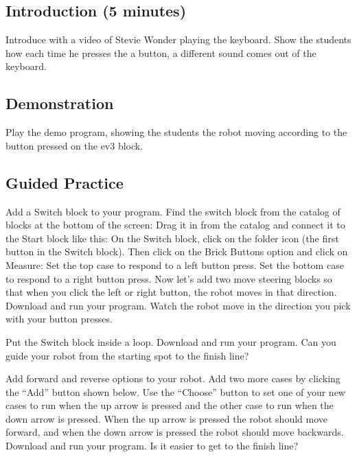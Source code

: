 \documentclass{lessonplan}
\begin{document}
    \subsection{Introduction (5 minutes)}
      Introduce with a video of Stevie Wonder playing the keyboard. Show the students how each time he presses the a button, a different sound comes out of the keyboard.
      
    \subsection{Demonstration}
      Play the demo program, showing the students the robot moving according to the button pressed on the ev3 block.
      
    \subsection{Guided Practice}
    Add a Switch block to your program.
    Find the switch block from the catalog of blocks at the bottom of the screen:
    Drag it in from the catalog and connect it to the Start block like this:
    On the Switch block, click on the folder icon (the first button in the Switch block).  Then click on the Brick Buttons option and click on Measure:
    Set the top case to respond to a left button press. Set the bottom case to respond to a right button press. Now let’s add two move steering blocks so that when you click the left or right button, the robot moves in that direction.
    Download and run your program.
    Watch the robot move in the direction you pick with your button presses.
    \par
    Put the Switch block inside a loop.
    Download and run your program. Can you guide your robot from the starting spot to the finish line?
    \par
    Add forward and reverse options to your robot.
    Add two more cases by clicking the “Add” button shown below. Use the “Choose” button to set one of your new cases to run when the up arrow is pressed and the other case to run when the down arrow is pressed. 
    When the up arrow is pressed the robot should move forward, and when the down arrow is pressed the robot should move backwards.
    Download and run your program.
    Is it easier to get to the finish line?
\end{document}
